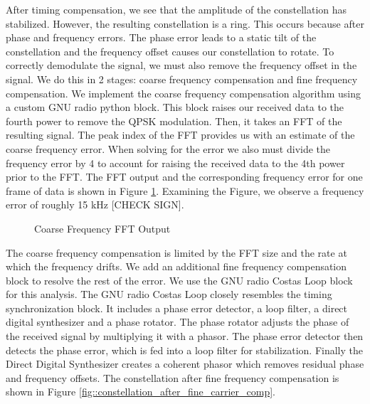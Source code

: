 \documentclass[conference,onecolumn]{IEEEtran}
\begin{document}
After timing compensation, we see that the amplitude of the constellation has stabilized. However, the resulting constellation is a ring. This occurs because after phase and frequency errors. The phase error leads to a static tilt of the constellation and the frequency offset causes our constellation to rotate. To correctly demodulate the signal, we must also remove the frequency offset in the signal. We do this in 2 stages: coarse frequency compensation and fine frequency compensation. We implement the coarse frequency compensation algorithm using a custom GNU radio python block. This block raises our received data to the fourth power to remove the QPSK modulation. Then, it takes an FFT of the resulting signal. The peak index of the FFT provides us with an estimate of the coarse frequency error. When solving for the error we also must divide the frequency error by 4 to account for raising the received data to the 4th power prior to the FFT. The FFT output and the corresponding frequency error for one frame of data is shown in Figure \ref{fig::cfo_frequency_estimate}. Examining the Figure, we observe a frequency error of roughly 15 kHz [CHECK SIGN].

\begin{figure}[H]
	\centerline{}
	\caption{Coarse Frequency FFT Output}
	\label{fig::cfo_frequency_estimate}
\end{figure}

The coarse frequency compensation is limited by the FFT size and the rate at which the frequency drifts. We add an additional fine frequency compensation block to resolve the rest of the error. We use the GNU radio Costas Loop block for this analysis. The GNU radio Costas Loop closely resembles the timing synchronization block. It includes a phase error detector, a loop filter, a direct digital synthesizer and a phase rotator.
The phase rotator adjusts the phase of the received signal by multiplying it with a phasor. The phase error detector then detects the phase error, which is fed into a loop filter for stabilization. Finally the Direct Digital Synthesizer creates a coherent phasor which removes residual phase and frequency offsets. The constellation after fine frequency compensation is shown in Figure \ref{fig::constellation_after_fine_carrier_comp}.
\end{document}
